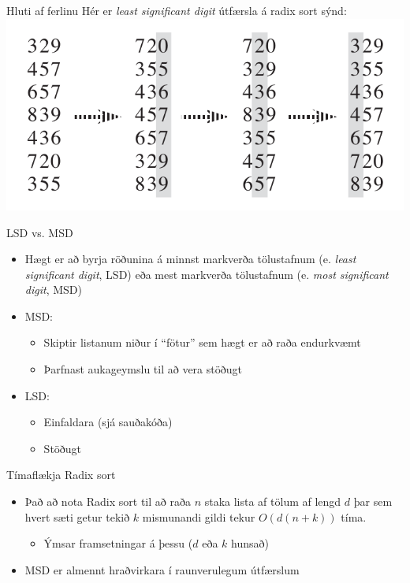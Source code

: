 \documentclass{beamer}
\begin{document}
\begin{frame}{Hluti af ferlinu}
Hér er \emph{least significant digit} útfærsla á radix sort sýnd:
\includegraphics[width=\textwidth]{Pics/RadixSort}
\end{frame}

\begin{frame}{LSD vs. MSD}
\begin{itemize}
 \item Hægt er að byrja röðunina á minnst markverða tölustafnum (e. \emph{least significant digit}, LSD) eða mest markverða tölustafnum (e. \emph{most significant digit}, MSD)
 \item MSD:
 \begin{itemize}
  \item Skiptir listanum niður í ``fötur'' sem hægt er að raða endurkvæmt
  \item Þarfnast aukageymslu til að vera stöðugt
 \end{itemize}
 \item LSD:
 \begin{itemize}
  \item Einfaldara (sjá sauðakóða)
  \item Stöðugt
 \end{itemize}
\end{itemize}
\end{frame}

\begin{frame}{Tímaflækja Radix sort}
\begin{itemize}
 \item Það að nota Radix sort til að raða $n$ staka lista af tölum af lengd $d$ þar sem hvert sæti getur tekið $k$ mismunandi gildi tekur $O(d(n+k))$ tíma.
 \begin{itemize}
  \item Ýmsar framsetningar á þessu ($d$ eða $k$ hunsað)
 \end{itemize}
 \item MSD er almennt hraðvirkara í raunverulegum útfærslum
\end{itemize}

\end{frame}
\end{document}
